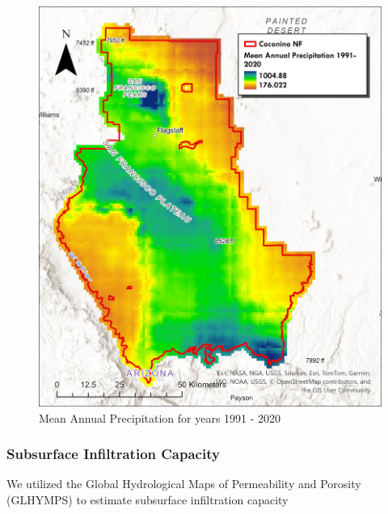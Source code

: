 \documentclass[
  number]{elsarticle}
\begin{document}
\begin{figure}[H]

{\centering \includegraphics{images/Mean_Annual_Precipitation.jpg}

}

\caption{Mean Annual Precipitation for years 1991 - 2020}

\end{figure}%

\subsubsection{Subsurface Infiltration
Capacity}\label{subsurface-infiltration-capacity}

We utilized the Global Hydrological Maps of Permeability and Porosity
(GLHYMPS) to estimate subsurface infiltration capacity
\citep{gleeson2014}
\end{document}
